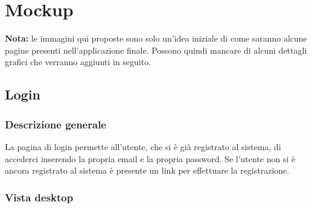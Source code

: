 %

\appendix


\section{Mockup} %
\label{sec:mockup}
\textbf{Nota:} le immagini qui proposte sono solo un'idea iniziale di come saranno alcune pagine presenti nell'applicazione finale. Possono quindi mancare di alcuni dettagli grafici che verranno aggiunti in seguito.

	\subsection{Login} %
	\label{sub:login}
		\subsubsection{Descrizione generale} %
		La pagina di login permette all'utente, che si è già registrato al sistema, di accederci inserendo la propria email e la propria password. Se l'utente non si è ancora registrato al sistema è presente un link per effettuare la registrazione.

		\subsubsection{Vista desktop} %

